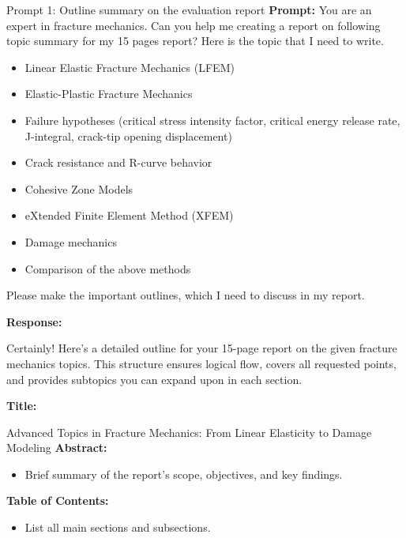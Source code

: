 \documentclass[12pt]{article}
\begin{document}
\begin{summarybox}{Prompt 1: Outline summary on the evaluation report}
\textbf{Prompt:} You are an expert in fracture mechanics. Can you help me creating a report on following topic summary for my 15 pages report? Here is the topic that I need to write.
\begin{itemize}
    \item Linear Elastic Fracture Mechanics (LFEM)
    \item Elastic-Plastic Fracture Mechanics
    \item Failure hypotheses (critical stress intensity factor, critical energy release rate, J-integral, crack-tip opening displacement)
    \item Crack resistance and R-curve behavior
    \item Cohesive Zone Models
    \item eXtended Finite Element Method (XFEM)
    \item Damage mechanics
    \item Comparison of the above methods
\end{itemize}

Please make the important outlines, which I need to discuss in my report.
\vspace{1em}

\textbf{Response:}

Certainly! Here’s a detailed outline for your 15-page report on the given fracture mechanics topics. This structure ensures logical flow, covers all requested points, and provides subtopics you can expand upon in each section.
\vspace{1em}

\textbf{Title:}

Advanced Topics in Fracture Mechanics: From Linear Elasticity to Damage Modeling
\vspace{1em}
\textbf{Abstract:}

\begin{itemize}
    \item Brief summary of the report’s scope, objectives, and key findings.
\end{itemize}


\textbf{Table of Contents:}

\begin{itemize}
    \item List all main sections and subsections.
\end{itemize}
\end{summarybox}
\end{document}
